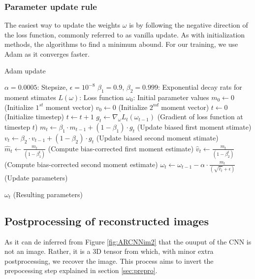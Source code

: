 \subsubsection{Parameter update rule}     
The easiest way to update the weights $\omega$ is by following the negative direction of the loss function, commonly referred to as vanilla update. As with initialization methods, the algorithms to find a minimum abound. For our training, we use Adam \cite{kingma2014adam} as it converges faster.

\begin{algorithm}
\caption{Adam update}
\label{Adamalg}
\begin{algorithmic}[1]
    \Require $\alpha = 0.0005 $: Stepsize, $\epsilon = 10^{-8}$ 
    \Require $\beta_1 = 0.9$, $\beta_2 = 0.999$: Exponential decay rats for moment stimates
    \Require $L ( \omega ) $: Loss function
    \Require $ \omega_0 $: Initial parameter values
    \State $m_0 \leftarrow 0$ (Initialize $1^{st}$ moment vector)
    \State $v_0 \leftarrow 0$ (Initialize $2^{nd}$ moment vector)
    \State $t \leftarrow 0$ (Initialize timestep)
        \State $t \leftarrow t+1$ 
        \State $g_t \leftarrow \nabla_{\omega} L_t ( \omega_{t-1} )$ (Gradient of loss function at timestep $t$)
        \State $m_t \leftarrow \beta_1 \cdot m_{t-1} + ( 1 -  \beta_1) \cdot g_t $ (Update biased first moment stimate)
        \State $v_t \leftarrow \beta_2 \cdot v_{t-1} + (1 - \beta_2) \cdot g_t $ (Update biased second moment stimate)
        \State $\hat{m}_t \leftarrow \frac{m_t}{( 1 - \beta_{1}^{t} )}$  (Compute bias-corrected first moment estimate)
        \State $\hat{v}_t \leftarrow \frac{m_t}{( 1 - \beta_{2}^{t} )}$  (Compute bias-corrected second moment estimate)
        \State $\omega_t \leftarrow \omega_{t-1} - \alpha \cdot \frac{ \hat{m}_t }{ ( \sqrt{\hat{v}_t } + \epsilon ) } $ (Update parameters)

    \EndWhile
    
    \State \Return $\omega_t $ (Resulting parameters)   
\end{algorithmic}
\end{algorithm}
    

\subsection{Postprocessing of reconstructed images}
As it can de inferred from Figure \ref{fig:ARCNNim2} that the ouuput of the CNN is not an image. Rather, it is a 3D tensor from which, with minor extra postprocessing, we recover the image. This process aims to invert the prepocessing step explained in section \ref{sec:prepro}. \\\\

